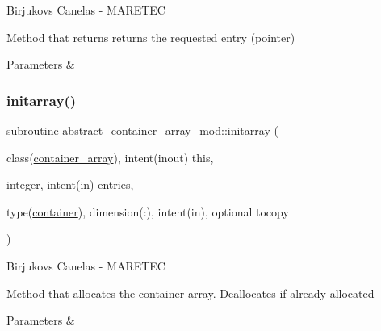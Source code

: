 Birjukovs Canelas -\/ M\+A\+R\+E\+T\+EC 

Method that returns returns the requested entry (pointer) 
\begin{DoxyParams}{Parameters}
{\em } & \\
\hline
\end{DoxyParams}
\mbox{\label{namespaceabstract__container__array__mod_a6a8e7af177f333262aba941775d6c245}} 
\subsubsection{\texorpdfstring{initarray()}{initarray()}}
{\footnotesize\ttfamily subroutine abstract\+\_\+container\+\_\+array\+\_\+mod\+::initarray (\begin{DoxyParamCaption}\item[{class(\hyperlink{structabstract__container__array__mod_1_1container__array}{container\+\_\+array}), intent(inout)}]{this,  }\item[{integer, intent(in)}]{entries,  }\item[{type(\hyperlink{structcontainer__mod_1_1container}{container}), dimension(\+:), intent(in), optional}]{tocopy }\end{DoxyParamCaption})\hspace{0.3cm}{\ttfamily [private]}}



Birjukovs Canelas -\/ M\+A\+R\+E\+T\+EC 

Method that allocates the container array. Deallocates if already allocated 
\begin{DoxyParams}{Parameters}
{\em } & \\
\hline
\end{DoxyParams}
\mbox{\label{namespaceabstract__container__array__mod_aae1f6309c51e282a528ce78f128443e0}} 

